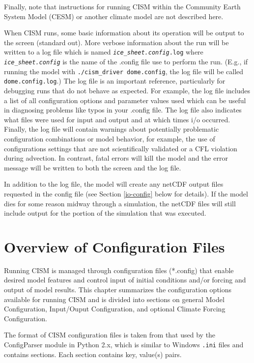 Finally, note that instructions for running CISM within the Community Earth System Model (CESM)
or another climate model are not described here.

When CISM runs, some basic information about its operation will be output to 
the screen (standard out).  More verbose information about the run will be written 
to a log file which is named \texttt{\textit{ice\_sheet.config}.log} where 
\texttt{\textit{ice\_sheet.config}} is the name of the .config file use to perform
the run.  (E.g., if running the model with  \texttt{./cism\_driver dome.config},
the log file will be called  \texttt{dome.config.log}.)  The log file is an
important reference, particularly for debugging runs that do not behave as expected.
For example, the log file includes a list of all configuration options and parameter
values used which can be useful in diagnosing problems like typos in your .config file.
The log file also indicates what files were used for input and output and at which
times i/o occurred.  Finally, the log file will contain warnings about potentially
problematic configuration combinations or model behavior, for example, the use of
configurations settings that are not scientifically validated or a CFL violation
during advection.  In contrast, fatal errors will kill the model and the error
message will be written to both the screen and the log file.

In addition to the log file, the model will create any netCDF output files requested
in the config file (see Section \ref{io-config} below for details).  
If the model dies for some reason midway through a simulation,
the netCDF files will still include output for the portion of the simulation that 
was executed.

\section{Overview of Configuration Files}

Running CISM is managed through configuration files (*.config) that enable 
desired model features and control input of initial conditions and/or forcing 
and output of model results.  This chapter summarizes the configuration options 
available for running CISM and is divided into sections on general Model Configuration, 
Input/Ouput Configuration, and optional Climate Forcing Configuration.

The format of CISM configuration files is taken from that used by the 
ConfigParser module in Python 2.x, which is similar to Windows \texttt{.ini} files 
and contains sections. Each section contains key, value(s) pairs.

